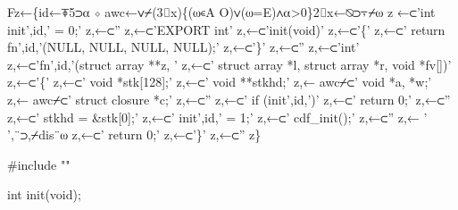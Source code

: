 \documentclass{article}%
\begin{document}
\nwenddocs{}\plusendmoddef\nwstartdeflinemarkup{}\nwenddeflinemarkup
Fz←\{id←⍕5⊃⍺ ⋄ awc←∨⌿(3⌷x)\{(⍵∊A O)∨(⍵=E)∧⍺>0\}2⌷x←⍉⊃⍪⌿⍵
        z ←⊂'int init',id,' = 0;'
        z,←⊂''
        z,←⊂'EXPORT int'
        z,←⊂'init(void)'
        z,←⊂'\{'
        z,←⊂' return fn',id,'(NULL, NULL, NULL, NULL);'
        z,←⊂'\}'
        z,←⊂''
        z,←⊂'int'
        z,←⊂'fn',id,'(struct array **z, '
        z,←⊂'    struct array *l, struct array *r, void *fv[])'
        z,←⊂'\{'
        z,←⊂'       void    *stk[128];'
        z,←⊂'       void    **stkhd;'
        z,← awc⌿⊂'        void    *a, *w;'
        z,← awc⌿⊂'        struct  closure *c;'
        z,←⊂''
        z,←⊂'       if (init',id,')'
        z,←⊂'               return 0;'
        z,←⊂''
        z,←⊂'       stkhd = &stk[0];'
        z,←⊂'       init',id,' = 1;'
        z,←⊂'       cdf_init();'
        z,←⊂''
        z,← ' ',¨⊃,⌿dis¨⍵
        z,←⊂'       return 0;'
        z,←⊂'\}'
        z,←⊂''
z\}
\nwendcode{}\nwdocspar

\nwenddocs{}\endmoddef\nwstartdeflinemarkup\nwenddeflinemarkup
#include ""

int
init(void);
\end{document}

